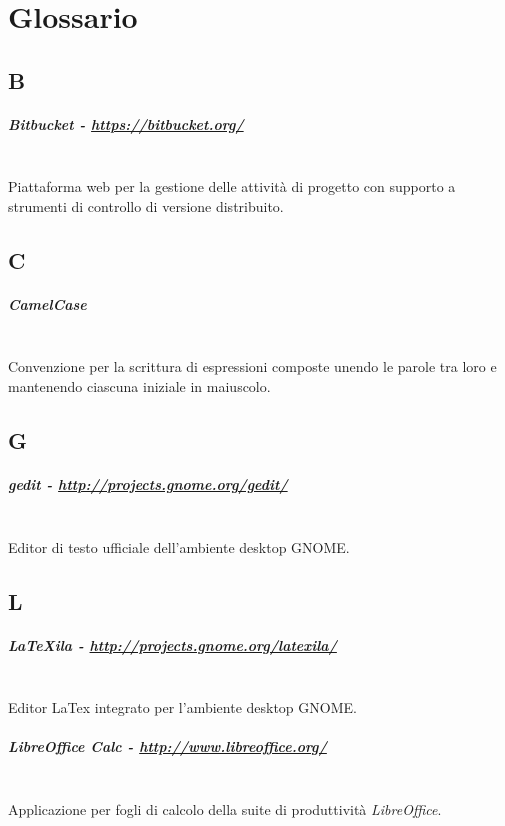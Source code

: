 \chapter{Glossario}
\label{ch:tesi:appendice:glossario}

\section*{B}
\paragraph{Bitbucket - \url{https://bitbucket.org/}} \hfill \\
Piattaforma web per la gestione delle attività di progetto con supporto a strumenti di controllo di versione distribuito.

\section*{C}
\paragraph{CamelCase} \hfill \\
Convenzione per la scrittura di espressioni composte unendo le parole tra loro e mantenendo ciascuna iniziale in maiuscolo.

\section*{G}
\paragraph{gedit - \url{http://projects.gnome.org/gedit/}} \hfill \\
Editor di testo ufficiale dell'ambiente desktop GNOME.

\section*{L}
\paragraph{LaTeXila - \url{http://projects.gnome.org/latexila/}} \hfill \\
Editor LaTex integrato per l'ambiente desktop GNOME.
\paragraph{LibreOffice Calc - \url{http://www.libreoffice.org/}} \hfill \\
Applicazione per fogli di calcolo della suite di produttività \textit{LibreOffice}.

